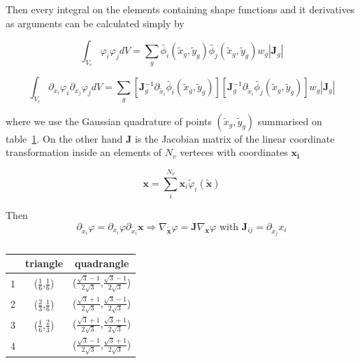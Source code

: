 \documentclass[preprint]{elsarticle}
\begin{document}
Then every integral on the elements containing shape functions and it derivatives as arguments
can be calculated simply by

\begin{equation}
\int_{V_{e}} \varphi_i \varphi_j dV = \sum_{g}
\tilde{\phi_i}(\tilde{x}_g,\tilde{y}_g) 
\tilde{\phi_j}(\tilde{x}_g,\tilde{y}_g) 
w_g |\bm{J}_g|
\end{equation}

\begin{equation}
\int_{V_{e}} \partial_{x_i}\varphi_i \partial_{x_j}\varphi_j dV = \sum_{g}
\left[
\bm{J}_g^{-1}\partial_{\tilde{x}_i}\tilde{\phi_i}(\tilde{x}_g,\tilde{y}_g)
\right]
\left[
\bm{J}_g^{-1}\partial_{\tilde{x}_i}\tilde{\phi_j}(\tilde{x}_g,\tilde{y}_g) 
\right]
w_g |\bm{J}_g|
\end{equation}

where we use the Gaussian quadrature of points $(\tilde{x}_g,\tilde{y}_g)$
summarised on table~\ref{tab:gauss}. On the other hand $\bm{J}$ is the
Jacobian matrix of the linear coordinate transformation inside an elements of
$N_v$ verteces with coordinates $\bm{x_i}$

\begin{equation}
\bm{x} =
\sum_{i}^{N_{v}} \bm{x}_i \tilde{\varphi}_i (\tilde{\bm{x}})
\end{equation}

Then
\begin{equation}
\partial_{\tilde{x}_i} \varphi =
\partial_{x_i} \varphi
\partial_{\tilde{x}_i} \bm{x} 
\Rightarrow 
\nabla_{\tilde{\bm{x}}} \varphi =
\bm{J}
\nabla_{\bm{x}} \varphi \text{ with }
\bm{J}_{ij} = 
\partial_{\tilde{x}_j} x_i 
\end{equation}



\begin{table}[ht]
\centering
\begin{tabular}{ | c | c | c | }
\hline
& triangle & quadrangle \\ 
\hline
1 &($\frac{1}{6}$,$\frac{1}{6}$)& ($\frac{\sqrt{3}-1}{2\sqrt{3}}$,$\frac{\sqrt{3}-1}{2\sqrt{3}}$)\\
2 &($\frac{2}{3}$,$\frac{1}{6}$)& ($\frac{\sqrt{3}+1}{2\sqrt{3}}$,$\frac{\sqrt{3}-1}{2\sqrt{3}}$)\\
3 &($\frac{1}{6}$,$\frac{2}{3}$)& ($\frac{\sqrt{3}+1}{2\sqrt{3}}$,$\frac{\sqrt{3}+1}{2\sqrt{3}}$)\\
4 &                             & ($\frac{\sqrt{3}-1}{2\sqrt{3}}$,$\frac{\sqrt{3}+1}{2\sqrt{3}}$)\\
\hline 
\end{tabular}
\caption{\label{tab:gauss}}
\end{table}
\end{document}
